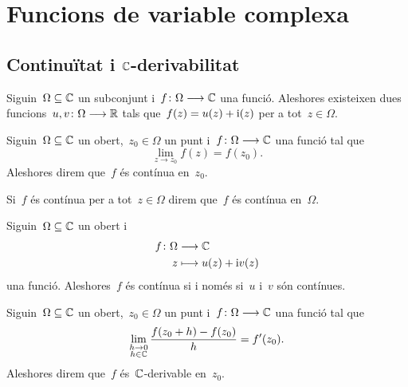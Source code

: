 \documentclass[../Apunts.tex]{subfiles}
\begin{document}
\section{Funcions de variable complexa}
    \subsection{Continuïtat i \ensuremath{\CC}-derivabilitat}
    \begin{observation}
        Siguin~\(\Omega\subseteq\mathbb{C}\) un subconjunt
        i~\(f\colon\Omega\longrightarrow\mathbb{C}\) una funció.
        Aleshores existeixen dues funcions~\(u,v\colon\Omega\longrightarrow\mathbb{R}\)
        tals que~\(f(z)=u(z)+\mathrm{i}(z)\) per a tot~\(z\in\Omega\).
    \end{observation}
    \begin{definition}[Continuïtat]
        \label{def:funció complexa contínua}
        Siguin~\(\Omega\subseteq\mathbb{C}\) un obert,~\(z_{0}\in\Omega\) un punt
        i~\(f\colon\Omega\longrightarrow\mathbb{C}\) una funció tal que
        \[\lim_{z\to z_{0}}f(z)=f(z_{0}).\]
        Aleshores direm que~\(f\) és contínua en~\(z_{0}\).
        
        Si~\(f\) és contínua per a tot~\(z\in\Omega\) direm que~\(f\) és
        contínua en~\(\Omega\).
    \end{definition}
    \begin{observation}
        \label{obs:una funció complexa és contínua si i només si %
        ho són les seves components}
        Siguin~\(\Omega\subseteq\mathbb{C}\) un obert i
        \begin{align*}
            f\colon\Omega&\longrightarrow\mathbb{C} \\
            z&\longmapsto u(z)+\mathrm{i} v(z)
        \end{align*}
        una funció.
        Aleshores~\(f\) és contínua si i només si~\(u\) i~\(v\) són contínues.
    \end{observation}
    \begin{definition}
        \label{def:C-derivable}\label{def:funció C-derivable}
        Siguin~\(\Omega\subseteq\mathbb{C}\) un obert,~\(z_{0}\in\Omega\) un punt
        i~\(f\colon\Omega\longrightarrow\mathbb{C}\) una funció tal que
        \[
            \lim_{\substack{h\to0\\ h\in\mathbb{C}}}\frac{f(z_{0}+h)-f(z_{0})}{h}
            =f'(z_{0}).
        \]
        Aleshores direm que~\(f\) és~\(\mathbb{C}\)-derivable en~\(z_{0}\).
    \end{definition}
\end{document}
